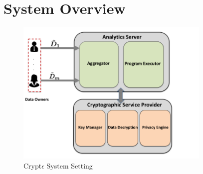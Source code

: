 
\section{System Overview} \begin{figure}{\textwidth}\includegraphics[height=7cm,width=9.31cm]{hh.png} \caption{ Crypt$\epsilon$ System Setting} \end{figure}
